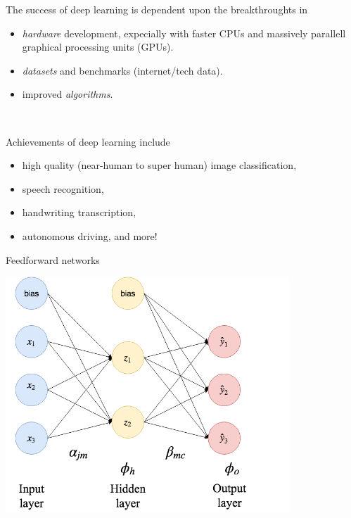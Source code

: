 \documentclass[
  10pt,
  ignorenonframetext,
]{beamer}
\providecommand{\tightlist}{%
  \setlength{\itemsep}{0pt}\setlength{\parskip}{0pt}}
\begin{document}
\begin{frame}
The success of deep learning is dependent upon the breakthroughts in

\begin{itemize}
\tightlist
\item
  \emph{hardware} development, expecially with faster CPUs and massively
  parallell graphical processing units (GPUs).
\item
  \emph{datasets} and benchmarks (internet/tech data).
\item
  improved \emph{algorithms}.
\end{itemize}

\(~\)

Achievements of deep learning include

\begin{itemize}
\tightlist
\item
  high quality (near-human to super human) image classification,
\item
  speech recognition,
\item
  handwriting transcription,
\item
  autonomous driving, and more!
\end{itemize}
\end{frame}

\begin{frame}{Feedforward networks}
\protect\hypertarget{feedforward-networks}{}
\centering

\includegraphics[width=0.8\textwidth,height=\textheight]{drawNNp3h2o3.png}
\end{frame}
\end{document}
